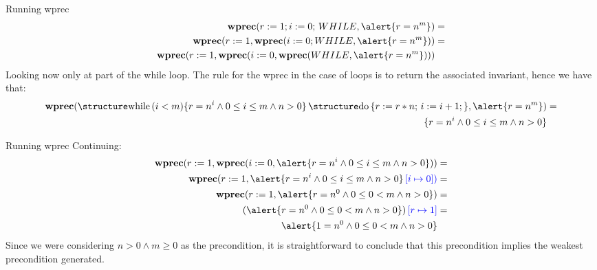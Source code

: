 \documentclass[aspectratio=169]{beamer}
\begin{document}
\begin{slide}{Running wprec}
\begin{align*}
  \textbf{wprec}(r := 1;i := 0;\,WHILE,\alert{r = n^m}) & = \\
  \textbf{wprec}(r :=1 ,\textbf{wprec}(i := 0;WHILE,\alert{r = n^m})) & = \\
  \textbf{wprec}(r :=1 ,\textbf{wprec}(i := 0,\textbf{wprec}(WHILE,\alert{r = n^m})))
\end{align*}
Looking now only at part of the while loop. The rule for the wprec in the case of loops is to return the associated invariant, hence we have that:
\begin{align*}
  \textbf{wprec}(\kw{while}\,(i < m)\{r = n^i \land 0 \leq i \leq m \land n > 0\}\,\kw{do}\,\{
r := r * n;\,i := i +1;\}, \alert{r = n^m}) & = \\
\{r = n^i \land 0 \leq i \leq m \land n > 0\}
\end{align*}
\end{slide}

\begin{slide}{Running wprec}
Continuing:
\begin{align*}
  \textbf{wprec}(r :=1 ,\textbf{wprec}(i := 0,\alert{r = n^i \land 0 \leq i \leq m \land n > 0})) & = \\
  \textbf{wprec}(r :=1 ,\alert{r = n^i \land 0 \leq i \leq m \land n > 0}\,\color{blue}{[i \mapsto 0]}) & =\\
  \textbf{wprec}(r :=1 , \alert{r = n^0 \land 0 \leq 0 < m \land n > 0}) & = \\
  (\alert{r = n^0 \land 0 \leq 0 < m \land n > 0})\,\color{blue}{[r \mapsto 1]} & =\\
  \alert{1 = n^0 \land 0 \leq 0 < m \land n > 0}
\end{align*}
Since we were considering $n > 0 \land m \geq 0$ as the precondition, it is straightforward to conclude that this precondition implies the weakest precondition generated.
\end{slide}
\end{document}
